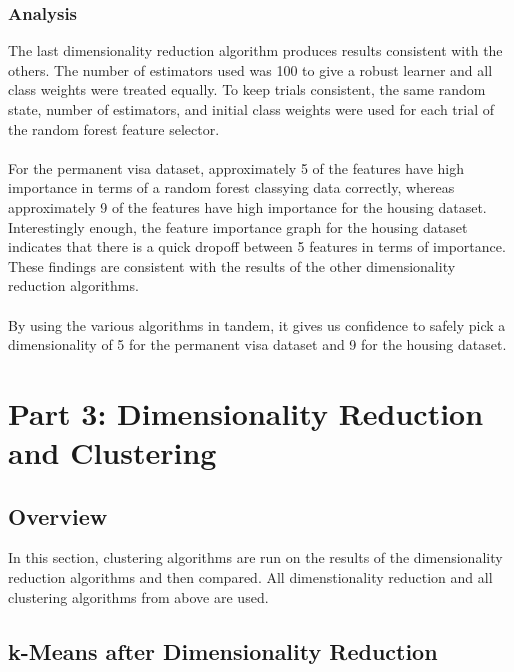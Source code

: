 \documentclass[h]{article}
\begin{document}
\subsubsection*{Analysis}
The last dimensionality reduction algorithm produces results consistent with the 
others. The number of estimators used was 100 to give a robust learner and all 
class weights were treated equally.  To keep trials consistent, the same random 
state, number of estimators, and initial class weights were used for each 
trial of the random forest feature selector.
\\ \\
For the permanent visa dataset, approximately 5 of the features have high importance 
in terms of a random forest classying data correctly, whereas approximately 9 of 
the features have high importance for the housing dataset.  Interestingly 
enough, the feature importance graph for the housing dataset indicates that there is a quick dropoff 
between 5 features in terms of importance.  These findings are consistent 
with the results of the other dimensionality reduction algorithms.  
\\ \\ 
By using the various algorithms in tandem, it gives us confidence to safely pick 
a dimensionality of 5 for the permanent visa dataset and 9 for the housing 
dataset.


\section*{Part 3: Dimensionality Reduction and Clustering}
\subsection*{Overview}
In this section, clustering algorithms are run on the results of the 
dimensionality reduction algorithms and then compared.  All dimenstionality 
reduction and all clustering algorithms from above are used.

\subsection*{k-Means after Dimensionality Reduction}
\end{document}
